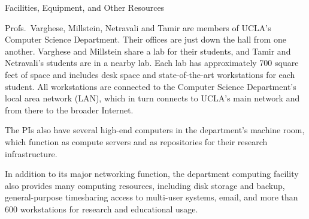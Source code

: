 \documentclass[11pt]{article}
\begin{document}
\begin{center}
 \begin{large}
Facilities, Equipment, and Other Resources \\
\end{large}
\end{center}


Profs.\ Varghese, Millstein, Netravali and Tamir are members of UCLA's
Computer Science Department.  Their offices are just down the hall from one another.  Varghese and Millstein share a lab for their students, and Tamir and Netravali's students are in a nearby lab.  Each lab has
approximately 700 square feet of space and
includes desk space and state-of-the-art workstations for each
student.
All workstations are
connected to the Computer Science Department's local area network (LAN),
which in turn connects to UCLA's main network and from there to the broader Internet. 

The PIs also have several high-end computers in the
department's machine room, which function as compute servers and as
repositories for their research infrastructure.


In addition to its major
networking function, the department computing facility also provides many
computing resources, including disk storage and backup, general-purpose timesharing access to multi-user systems, email, and more than 600 workstations for research
and educational usage.
\end{document}
